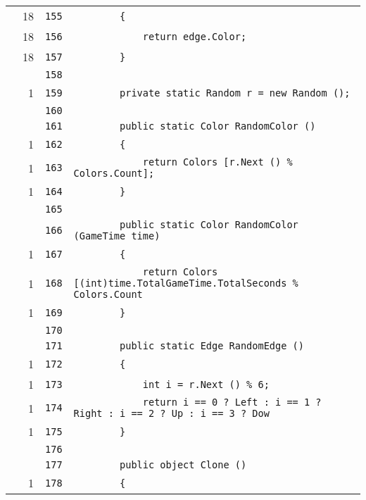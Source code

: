 \documentclass[a4paper,10pt]{article}
\begin{document}
\begin{longtable}[l]{lrrl}
\cellcolor{green} & 18 & \verb~155~ & \verb~        {~\\
\cellcolor{green} & 18 & \verb~156~ & \verb~            return edge.Color;~\\
\cellcolor{green} & 18 & \verb~157~ & \verb~        }~\\
\cellcolor{gray} &  & \verb~158~ & \verb~~\\
\cellcolor{green} & 1 & \verb~159~ & \verb~        private static Random r = new Random ();~\\
\cellcolor{gray} &  & \verb~160~ & \verb~~\\
\cellcolor{gray} &  & \verb~161~ & \verb~        public static Color RandomColor ()~\\
\cellcolor{green} & 1 & \verb~162~ & \verb~        {~\\
\cellcolor{green} & 1 & \verb~163~ & \verb~            return Colors [r.Next () % Colors.Count];~\\
\cellcolor{green} & 1 & \verb~164~ & \verb~        }~\\
\cellcolor{gray} &  & \verb~165~ & \verb~~\\
\cellcolor{gray} &  & \verb~166~ & \verb~        public static Color RandomColor (GameTime time)~\\
\cellcolor{green} & 1 & \verb~167~ & \verb~        {~\\
\cellcolor{green} & 1 & \verb~168~ & \verb~            return Colors [(int)time.TotalGameTime.TotalSeconds % Colors.Count~\\
\cellcolor{green} & 1 & \verb~169~ & \verb~        }~\\
\cellcolor{gray} &  & \verb~170~ & \verb~~\\
\cellcolor{gray} &  & \verb~171~ & \verb~        public static Edge RandomEdge ()~\\
\cellcolor{green} & 1 & \verb~172~ & \verb~        {~\\
\cellcolor{green} & 1 & \verb~173~ & \verb~            int i = r.Next () % 6;~\\
\cellcolor{green} & 1 & \verb~174~ & \verb~            return i == 0 ? Left : i == 1 ? Right : i == 2 ? Up : i == 3 ? Dow~\\
\cellcolor{green} & 1 & \verb~175~ & \verb~        }~\\
\cellcolor{gray} &  & \verb~176~ & \verb~~\\
\cellcolor{gray} &  & \verb~177~ & \verb~        public object Clone ()~\\
\cellcolor{green} & 1 & \verb~178~ & \verb~        {~\\

\end{longtable}
\end{document}
